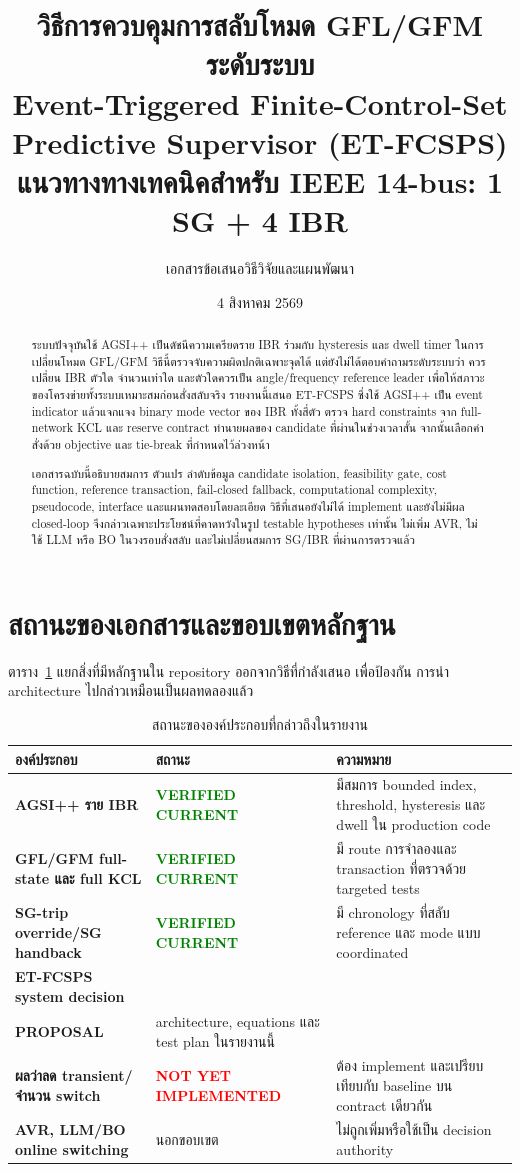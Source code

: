 \documentclass[12pt,a4paper]{article}
\title{\textbf{วิธีการควบคุมการสลับโหมด GFL/GFM ระดับระบบ}\\[.2em]
\large Event-Triggered Finite-Control-Set Predictive Supervisor (ET-FCSPS)\\[.3em]
\normalsize แนวทางทางเทคนิคสำหรับ IEEE 14-bus: 1 SG + 4 IBR}
\author{เอกสารข้อเสนอวิธีวิจัยและแผนพัฒนา}
\date{4 สิงหาคม 2569}
\newcommand{\currenttag}{\textcolor{green}{\textbf{VERIFIED CURRENT}}}
\newcommand{\proposedtag}{\textcolor{orange}{\textbf{\shortstack[l]{PROJECT-DERIVED\\PROPOSAL}}}}
\newcommand{\diagtag}{\textcolor{red}{\textbf{NOT YET IMPLEMENTED}}}
\begin{document}
\maketitle

\begin{abstract}
ระบบปัจจุบันใช้ AGSI++ เป็นดัชนีความเครียดราย IBR ร่วมกับ hysteresis และ dwell timer
ในการเปลี่ยนโหมด GFL/GFM วิธีนี้ตรวจจับความผิดปกติเฉพาะจุดได้ แต่ยังไม่ได้ตอบคำถามระดับระบบว่า
ควรเปลี่ยน IBR ตัวใด จำนวนเท่าใด และตัวใดควรเป็น angle/frequency reference leader
เพื่อให้สภาวะของโครงข่ายทั้งระบบเหมาะสมก่อนสั่งสลับจริง รายงานนี้เสนอ ET-FCSPS ซึ่งใช้ AGSI++
เป็น event indicator แล้วแจกแจง binary mode vector ของ IBR ทั้งสี่ตัว ตรวจ hard constraints
จาก full-network KCL และ reserve contract ทำนายผลของ candidate ที่ผ่านในช่วงเวลาสั้น
จากนั้นเลือกคำสั่งด้วย objective และ tie-break ที่กำหนดไว้ล่วงหน้า

เอกสารฉบับนี้อธิบายสมการ ตัวแปร ลำดับข้อมูล candidate isolation, feasibility gate,
cost function, reference transaction, fail-closed fallback, computational complexity,
pseudocode, interface และแผนทดสอบโดยละเอียด วิธีที่เสนอยังไม่ได้ implement และยังไม่มีผล
closed-loop จึงกล่าวเฉพาะประโยชน์ที่คาดหวังในรูป testable hypotheses เท่านั้น ไม่เพิ่ม AVR,
ไม่ใช้ LLM หรือ BO ในวงรอบสั่งสลับ และไม่เปลี่ยนสมการ SG/IBR ที่ผ่านการตรวจแล้ว
\end{abstract}

\tableofcontents
\newpage

\section{สถานะของเอกสารและขอบเขตหลักฐาน}

ตาราง~\ref{tab:status} แยกสิ่งที่มีหลักฐานใน repository ออกจากวิธีที่กำลังเสนอ เพื่อป้องกัน
การนำ architecture ไปกล่าวเหมือนเป็นผลทดลองแล้ว

\begin{table}[H]
\centering
\caption{สถานะขององค์ประกอบที่กล่าวถึงในรายงาน}
\label{tab:status}
\begin{tabularx}{\textwidth}{>{\bfseries}p{}p{}X}
\toprule
องค์ประกอบ & สถานะ & ความหมาย \\
\midrule
AGSI++ ราย IBR & \currenttag & มีสมการ bounded index, threshold, hysteresis และ dwell ใน production code \\
GFL/GFM full-state และ full KCL & \currenttag & มี route การจำลองและ transaction ที่ตรวจด้วย targeted tests \\
SG-trip override/SG handback & \currenttag & มี chronology ที่สลับ reference และ mode แบบ coordinated \\
ET-FCSPS system decision & \proposedtag & architecture, equations และ test plan ในรายงานนี้ \\
ผลว่าลด transient/จำนวน switch & \diagtag & ต้อง implement และเปรียบเทียบกับ baseline บน contract เดียวกัน \\
AVR, LLM/BO online switching & นอกขอบเขต & ไม่ถูกเพิ่มหรือใช้เป็น decision authority \\
\bottomrule
\end{tabularx}
\end{table}
\end{document}
